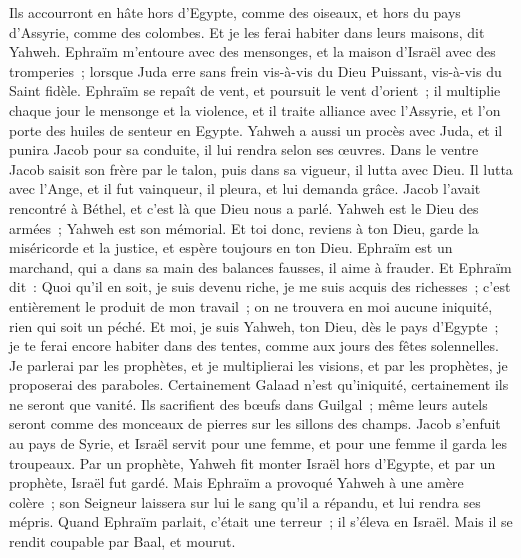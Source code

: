 \begin{multicols}{2}
Ils accourront en hâte hors d'Egypte, comme des oiseaux, et hors du pays d'Assyrie, comme des colombes. Et je les ferai habiter dans leurs maisons, dit Yahweh.
\VerseOne{}Ephraïm m'entoure avec des mensonges, et la maison d'Israël avec des tromperies~; lorsque Juda erre sans frein vis-à-vis du Dieu Puissant, vis-à-vis du Saint fidèle.
Ephraïm se repaît de vent, et poursuit le vent d'orient~; il multiplie chaque jour le mensonge et la violence, et il traite alliance avec l'Assyrie, et l'on porte des huiles de senteur en Egypte.
Yahweh a aussi un procès avec Juda, et il punira Jacob pour sa conduite, il lui rendra selon ses œuvres.
Dans le ventre Jacob saisit son frère par le talon, puis dans sa vigueur, il lutta avec Dieu.
Il lutta avec l'Ange, et il fut vainqueur, il pleura, et lui demanda grâce. Jacob l'avait rencontré à Béthel, et c'est là que Dieu nous a parlé.
Yahweh est le Dieu des armées~; Yahweh est son mémorial.
Et toi donc, reviens à ton Dieu, garde la miséricorde et la justice, et espère toujours en ton Dieu.
Ephraïm est un marchand, qui a dans sa main des balances fausses, il aime à frauder.
Et Ephraïm dit~: Quoi qu'il en soit, je suis devenu riche, je me suis acquis des richesses~; c'est entièrement le produit de mon travail~; on ne trouvera en moi aucune iniquité, rien qui soit un péché.
Et moi, je suis Yahweh, ton Dieu, dès le pays d'Egypte~; je te ferai encore habiter dans des tentes, comme aux jours des fêtes solennelles.
Je parlerai par les prophètes, et je multiplierai les visions, et par les prophètes, je proposerai des paraboles.
Certainement Galaad n'est qu'iniquité, certainement ils ne seront que vanité. Ils sacrifient des bœufs dans Guilgal~; même leurs autels seront comme des monceaux de pierres sur les sillons des champs.
Jacob s'enfuit au pays de Syrie, et Israël servit pour une femme, et pour une femme il garda les troupeaux.
Par un prophète, Yahweh fit monter Israël hors d'Egypte, et par un prophète, Israël fut gardé.
Mais Ephraïm a provoqué Yahweh à une amère colère~; son Seigneur laissera sur lui le sang qu'il a répandu, et lui rendra ses mépris.
\VerseOne{}Quand Ephraïm parlait, c'était une terreur~; il s'éleva en Israël. Mais il se rendit coupable par Baal, et mourut.

\end{multicols}
